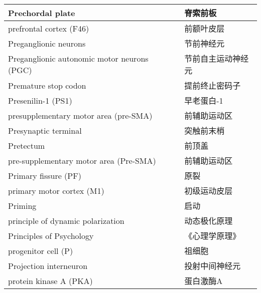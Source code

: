 \begin{longtable}{lll}
	\midrule
	Prechordal plate     && 	脊索前板   \\
	
	\midrule
	prefrontal cortex (F46)     && 	前额叶皮层   \\
	
	\midrule
	Preganglionic neurons     && 	节前神经元   \\
	
	\midrule
	Preganglionic autonomic motor neurons (PGC)     && 	节前自主运动神经元   \\
	
	\midrule
	Premature stop codon     && 	提前终止密码子   \\
	
	\midrule
	Presenilin-1 (PS1)     && 	早老蛋白-1   \\
	
	\midrule
	presupplementary motor area (pre-SMA)    && 	前辅助运动区   \\
	
	\midrule
	Presynaptic terminal     && 	突触前末梢   \\
	
	\midrule
	Pretectum     && 	前顶盖   \\
	
	\midrule
	pre-supplementary motor area (Pre-SMA)     && 	前辅助运动区   \\
	
	\midrule
	Primary fissure (PF)   && 原裂  \\
	
	\midrule
	primary motor cortex (M1)   && 初级运动皮层  \\
	
	\midrule
	Priming   && 启动  \\
	
	\midrule
	principle of dynamic polarization   && 动态极化原理  \\
	
	\midrule
	Principles of Psychology   && 《心理学原理》  \\
	
	\midrule
	progenitor cell (P)   && 祖细胞  \\
	
	\midrule
	Projection interneuron   && 投射中间神经元  \\
	
	\midrule
	protein kinase A (PKA)   && 蛋白激酶A  \\
	

\end{longtable}
